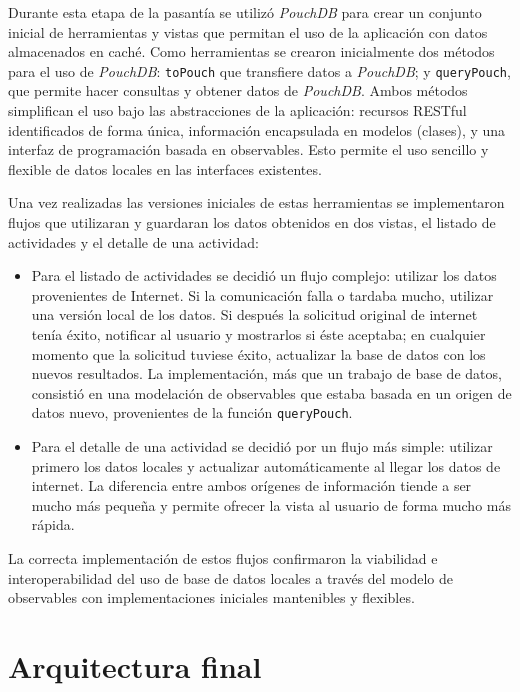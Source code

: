 Durante esta etapa de la pasantía se utilizó \textit{PouchDB} para crear un conjunto inicial de herramientas y vistas que permitan el uso de la aplicación con datos almacenados en caché. Como herramientas se crearon inicialmente dos métodos para el uso de \textit{PouchDB}: \texttt{toPouch} que transfiere datos a \textit{PouchDB}; y \texttt{queryPouch}, que permite hacer consultas y obtener datos de \textit{PouchDB}. Ambos métodos simplifican el uso bajo las abstracciones de la aplicación: recursos RESTful identificados de forma única, información encapsulada en modelos (clases), y una interfaz de programación basada en observables. Esto permite el uso sencillo y flexible de datos locales en las interfaces existentes.

Una vez realizadas las versiones iniciales de estas herramientas se implementaron flujos que utilizaran y guardaran los datos obtenidos en dos vistas, el listado de actividades y el detalle de una actividad:
\begin{itemize}
  \item Para el listado de actividades se decidió un flujo complejo: utilizar los datos provenientes de Internet. Si la comunicación falla o tardaba mucho, utilizar una versión local de los datos. Si después la solicitud original de internet tenía éxito, notificar al usuario y mostrarlos si éste aceptaba; en cualquier momento que la solicitud tuviese éxito, actualizar la base de datos con los nuevos resultados. La implementación, más que un trabajo de base de datos, consistió en una modelación de observables que estaba basada en un origen de datos nuevo, provenientes de la función \texttt{queryPouch}.

  \item Para el detalle de una actividad se decidió por un flujo más simple: utilizar primero los datos locales y actualizar automáticamente al llegar los datos de internet. La diferencia entre ambos orígenes de información tiende a ser mucho más pequeña y permite ofrecer la vista al usuario de forma mucho más rápida.
\end{itemize}

La correcta implementación de estos flujos confirmaron la viabilidad e interoperabilidad del uso de base de datos locales a través del modelo de observables con implementaciones iniciales mantenibles y flexibles.

\section{Arquitectura final}

